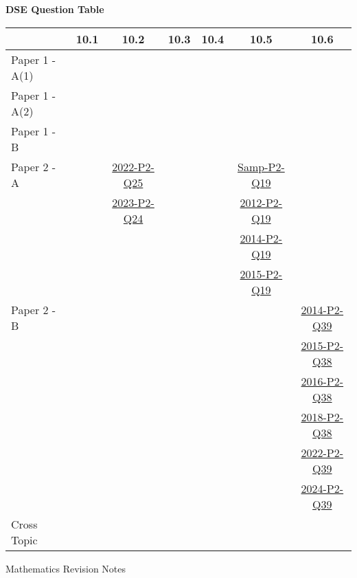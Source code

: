 \documentclass[12pt, a4paper]{article}
\begin{document}
\begin{absolutelynopagebreak}
\begin{center}
\textbf{DSE Question Table}
\end{center}
\begin{center}
\begin{tabular}{|l|c|c|c|c|c|c|}
\hline
        & 10.1 & 10.2 & 10.3 & 10.4 & 10.5 & 10.6 \\\hline
\hline
Paper 1 - A(1)&  &  &  &  &  &  \\
\hline
Paper 1 - A(2)&  &  &  &  &  &  \\
\hline
Paper 1 - B&  &  &  &  &  &  \\
\hline
\hline
Paper 2 - A&  & \hyperref[DSE2022-CoreP2-Q25]{2022-P2-Q25} &  &  & \hyperref[DSE2012S-CoreP2-Q19]{Samp-P2-Q19} &  \\
&  & \hyperref[DSE2023-CoreP2-Q24]{2023-P2-Q24} &  &  & \hyperref[DSE2012-CoreP2-Q19]{2012-P2-Q19} &  \\
&  &  &  &  & \hyperref[DSE2014-CoreP2-Q19]{2014-P2-Q19} &  \\
&  &  &  &  & \hyperref[DSE2015-CoreP2-Q19]{2015-P2-Q19} &  \\
\hline
Paper 2 - B&  &  &  &  &  & \hyperref[DSE2014-CoreP2-Q39]{2014-P2-Q39} \\
&  &  &  &  &  & \hyperref[DSE2015-CoreP2-Q38]{2015-P2-Q38} \\
&  &  &  &  &  & \hyperref[DSE2016-CoreP2-Q38]{2016-P2-Q38} \\
&  &  &  &  &  & \hyperref[DSE2018-CoreP2-Q38]{2018-P2-Q38} \\
&  &  &  &  &  & \hyperref[DSE2022-CoreP2-Q39]{2022-P2-Q39} \\
&  &  &  &  &  & \hyperref[DSE2024-CoreP2-Q39]{2024-P2-Q39} \\
\hline
\hline
Cross Topic&  &  &  &  &  &  \\
\hline
\end{tabular}
\end{center}
\end{absolutelynopagebreak}
\newpage
\newpage
\thispagestyle{empty}
\begin{center}
Mathematics Revision Notes\\\vspace{1cm}
\greybox{\fontsize{24pt}{24pt}\selectfont {S5 Chapters}} \\\vspace{1cm}
\end{center}
\vspace{0.5cm}
\hline
\end{document}
